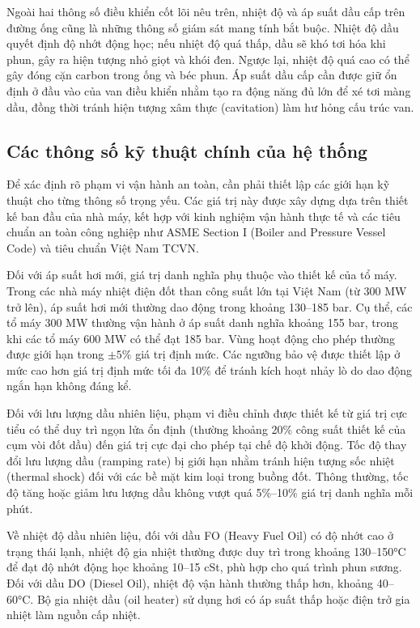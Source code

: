 \documentclass[../main.tex]{subfiles}
\begin{document}
Ngoài hai thông số điều khiển cốt lõi nêu trên, nhiệt độ và áp suất dầu cấp trên đường ống cũng là những thông số giám sát mang tính bắt buộc. Nhiệt độ dầu quyết định độ nhớt động học; nếu nhiệt độ quá thấp, dầu sẽ khó tơi hóa khi phun, gây ra hiện tượng nhỏ giọt và khói đen. Ngược lại, nhiệt độ quá cao có thể gây đóng cặn carbon trong ống và béc phun. Áp suất dầu cấp cần được giữ ổn định ở đầu vào của van điều khiển nhằm tạo ra động năng đủ lớn để xé tơi màng dầu, đồng thời tránh hiện tượng xâm thực (cavitation) làm hư hỏng cấu trúc van.

\subsection{Các thông số kỹ thuật chính của hệ thống}

Để xác định rõ phạm vi vận hành an toàn, cần phải thiết lập các giới hạn kỹ thuật cho từng thông số trọng yếu. Các giá trị này được xây dựng dựa trên thiết kế ban đầu của nhà máy, kết hợp với kinh nghiệm vận hành thực tế và các tiêu chuẩn an toàn công nghiệp như ASME Section I (Boiler and Pressure Vessel Code) và tiêu chuẩn Việt Nam TCVN.

Đối với áp suất hơi mới, giá trị danh nghĩa phụ thuộc vào thiết kế của tổ máy. Trong các nhà máy nhiệt điện đốt than công suất lớn tại Việt Nam (từ 300 MW trở lên), áp suất hơi mới thường dao động trong khoảng 130--185 bar. Cụ thể, các tổ máy 300 MW thường vận hành ở áp suất danh nghĩa khoảng 155 bar, trong khi các tổ máy 600 MW có thể đạt 185 bar. Vùng hoạt động cho phép thường được giới hạn trong $\pm5\%$ giá trị định mức. Các ngưỡng bảo vệ được thiết lập ở mức cao hơn giá trị định mức tối đa 10\% để tránh kích hoạt nhảy lò do dao động ngắn hạn không đáng kể.

Đối với lưu lượng dầu nhiên liệu, phạm vi điều chỉnh được thiết kế từ giá trị cực tiểu có thể duy trì ngọn lửa ổn định (thường khoảng 20\% công suất thiết kế của cụm vòi đốt dầu) đến giá trị cực đại cho phép tại chế độ khởi động. Tốc độ thay đổi lưu lượng dầu (ramping rate) bị giới hạn nhằm tránh hiện tượng sốc nhiệt (thermal shock) đối với các bề mặt kim loại trong buồng đốt. Thông thường, tốc độ tăng hoặc giảm lưu lượng dầu không vượt quá 5\%--10\% giá trị danh nghĩa mỗi phút.

Về nhiệt độ dầu nhiên liệu, đối với dầu FO (Heavy Fuel Oil) có độ nhớt cao ở trạng thái lạnh, nhiệt độ gia nhiệt thường được duy trì trong khoảng 130--150°C để đạt độ nhớt động học khoảng 10--15 cSt, phù hợp cho quá trình phun sương. Đối với dầu DO (Diesel Oil), nhiệt độ vận hành thường thấp hơn, khoảng 40--60°C. Bộ gia nhiệt dầu (oil heater) sử dụng hơi có áp suất thấp hoặc điện trở gia nhiệt làm nguồn cấp nhiệt.
\end{document}
